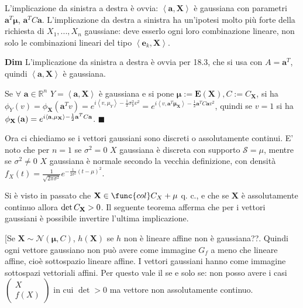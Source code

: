 \documentclass{article}
\begin{document}
L'implicazione da sinistra a destra \`{e} ovvia: $\left\langle \mathbf{a,X}%
\right\rangle $ \`{e} gaussiana con parametri $\mathbf{a}^{T}\mathbf{\mu }$, 
$\mathbf{a}^{T}C\mathbf{a}$. L'implicazione da destra a sinistra ha
un'ipotesi molto pi\`{u} forte della richiesta di $X_{1},...,X_{n}$
gaussiane: deve esserlo ogni loro combinazione lineare, non solo le
combinazioni lineari del tipo $\left\langle \mathbf{e}_{k}\mathbf{,X}%
\right\rangle $.

\textbf{Dim} L'implicazione da sinistra a destra \`{e} ovvia per 18.3, che
si usa con $A=\mathbf{a}^{T}$, quindi $\left\langle \mathbf{a,X}%
\right\rangle $ \`{e} gaussiana.

Se $\forall $ $\mathbf{a}\in 
\mathbb{R}
^{n}$ $Y=\left\langle \mathbf{a,X}\right\rangle $ \`{e} gaussiana e si pone $%
\mathbf{\mu }:=\mathbf{E}\left( \mathbf{X}\right) ,C:=C_{\mathbf{X}}$, si ha 
$\phi _{Y}\left( v\right) =\phi _{\mathbf{X}}\left( \mathbf{a}^{T}v\right)
=e^{i\left\langle v,\mu _{Y}\right\rangle -\frac{1}{2}\sigma
_{Y}^{2}v^{2}}=e^{i\left\langle v,\mathbf{a}^{T}\mathbf{\mu }_{\mathbf{X}%
}\right\rangle -\frac{1}{2}\mathbf{a}^{T}C\mathbf{a}v^{2}}$, quindi se $v=1$
si ha $\phi _{\mathbf{X}}\left( \mathbf{a}\right) =e^{i\left\langle \mathbf{a%
},\mathbf{\mu }_{\mathbf{X}}\right\rangle -\frac{1}{2}\mathbf{a}^{T}C\mathbf{%
a}}$. $\blacksquare $

Ora ci chiediamo se i vettori gaussiani sono discreti o assolutamente
continui. E' noto che per $n=1$ se $\sigma ^{2}=0$ $X$ gaussiana \`{e}
discreta con supporto $\mathcal{S}=\mu $, mentre se $\sigma ^{2}\neq 0$ $X$
gaussiana \`{e} normale secondo la vecchia definizione, con densit\`{a} $%
f_{X}\left( t\right) =\frac{1}{\sqrt{2\pi \sigma ^{2}}}e^{-\frac{1}{2\sigma
^{2}}\left( t-\mu \right) ^{2}}$.

Si \`{e} visto in passato che $\mathbf{X}\in \func{col}C_{X}+\mathbf{\mu }$
q. c., e che se $\mathbf{X}$ \`{e} assolutamente continuo allora $\det C_{%
\mathbf{X}}>0$. Il seguente teorema afferma che per i vettori gaussiani \`{e}
possibile invertire l'ultima implicazione.

[Se $\mathbf{X}\sim \mathcal{N}\left( \mathbf{\mu },C\right) $, $h\left( 
\mathbf{X}\right) $ se $h$ non \`{e} lineare affine non \`{e} gaussiana??.
Quindi ogni vettore gaussiano non pu\`{o} avere come immagine $G_{f}$ a meno
che lineare affine, cio\`{e} sottospazio lineare affine. I vettori gaussiani
hanno come immagine sottospazi vettoriali affini. Per questo vale il se e
solo se: non posso avere i casi $\left( 
\begin{array}{c}
X \\ 
f\left( X\right)%
\end{array}%
\right) $ in cui $\det >0$ ma vettore non assolutamente continuo.
\end{document}

